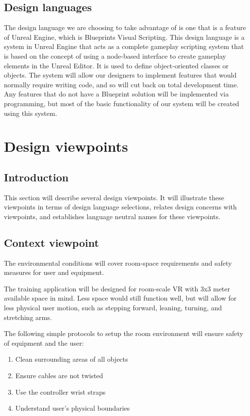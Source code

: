 \documentclass[onecolumn, draftclsnofoot,10pt, compsoc]{IEEEtran}
\begin{document}
\subsection{Design languages}
The design language we are choosing to take advantage of is one that is a feature of Unreal Engine, which is Blueprints Visual Scripting. This design language is a system in Unreal Engine that acts as a complete gameplay scripting system that is based on the concept of using a node-based interface to create gameplay elements in the Unreal Editor. It is used to define object-oriented classes or objects. The system will allow our designers to implement features that would normally require writing code, and so will cut back on total development time. Any features that do not have a Blueprint solution will be implemented via programming, but most of the basic functionality of our system will be created using this system.

\newpage

\section{Design viewpoints}
\subsection{Introduction}
This section will describe several design viewpoints. It will illustrate these viewpoints in terms of design language selections, relates design concerns with viewpoints, and establishes language neutral names for these viewpoints. 

\subsection{Context viewpoint}
The environmental conditions will cover room-space requirements and safety measures for user and equipment.

The training application will be designed for room-scale VR with 3x3 meter available space in mind. Less space would still function well, but will allow for less physical user motion, such as stepping forward, leaning, turning, and stretching arms. 

The following simple protocols to setup the room environment will ensure safety of equipment and the user:
\begin{enumerate}
    \item Clean surrounding areas of all objects
    \item Ensure cables are not twisted
    \item Use the controller wrist straps
    \item Understand user's physical boundaries
\end{enumerate}
\end{document}
